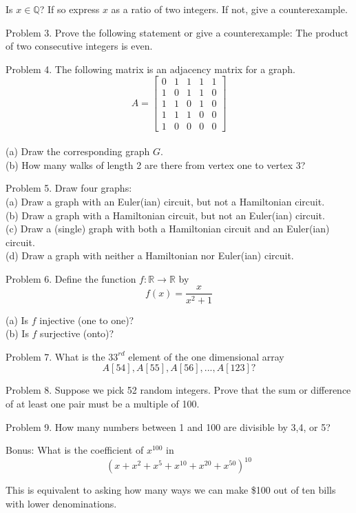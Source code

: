 \documentclass[16 pt]{amsart}
\theoremstyle{definition}
\theoremstyle{remark}
\numberwithin{equation}{subsection}
\newcommand{\R}{\mathbb{R}}
\newcommand{\Q}{\mathbb{Q}}
\begin{document}
Is $x\in\Q$?  If so express $x$ as a ratio of two integers. If not, give a counterexample.




\newpage

Problem 3. Prove the following statement or give a counterexample: The product of two consecutive integers is even.

\newpage

Problem 4. The following matrix is an adjacency matrix for a graph.\\
\[
A = 
\begin{bmatrix}
0 & 1 & 1 & 1 & 1\\
1 & 0 & 1 & 1 & 0\\
1 & 1 & 0 & 1 & 0\\
1 & 1 & 1 & 0 & 0\\
1 & 0 & 0 & 0 & 0
\end{bmatrix}
\]
\\

(a) Draw the corresponding graph $G$.\\

(b) How many walks of length 2 are there from vertex one to vertex 3?


\newpage

Problem 5. Draw four graphs:\\
(a) Draw a graph with an Euler(ian) circuit, but not a Hamiltonian circuit.\\
(b) Draw a graph with a Hamiltonian circuit, but not an Euler(ian) circuit.\\
(c) Draw a (single) graph with both a Hamiltonian circuit and an Euler(ian) circuit.\\
(d) Draw a graph with neither a Hamiltonian nor Euler(ian) circuit.


\newpage

Problem 6. Define the function $f: \R \rightarrow \R$ by
\[
f(x) = \frac{x}{x^2+1}
\]

(a) Is $f$ injective (one to one)?\\

(b) Is $f$ surjective (onto)?


\newpage

Problem 7. What is the $33^{rd}$ element of the one dimensional array
\[
A[54],A[55],A[56],...,A[123]?
\]

\newpage

Problem 8. Suppose we pick 52 random integers.  Prove that the sum or difference of at least one pair must be a multiple of 100.


\newpage


Problem 9. How many numbers between 1 and 100 are divisible by 3,4, or 5?


\newpage
Bonus: What is the coefficient of $x^{100}$ in
\[
(x+x^2+x^5+x^{10}+x^{20}+x^{50})^{10}
\]

This is equivalent to asking how many ways we can make \$100 out of ten bills with lower denominations.
\end{document}
